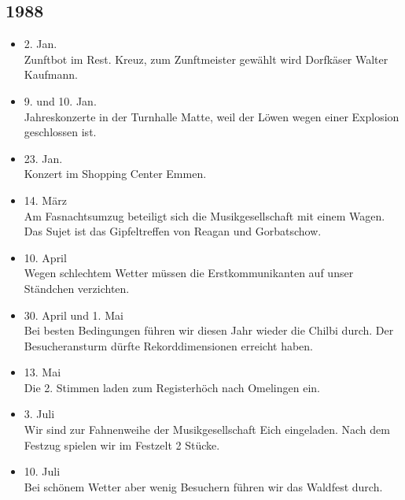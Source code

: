 \subsection{1988}

\begin{history}


    \begin{itemize}

        \item 2. Jan.\\
              Zunftbot im Rest. Kreuz, zum Zunftmeister gewählt wird Dorfkäser Walter
              Kaufmann.

        \item 9. und 10. Jan.\\
              Jahreskonzerte in der Turnhalle Matte, weil der Löwen wegen einer
              Explosion geschlossen ist.

        \item 23. Jan.\\
              Konzert im Shopping Center Emmen.

        \item 14. März\\
              Am Fasnachtsumzug beteiligt sich die Musikgesellschaft mit einem Wagen.
              Das Sujet ist das Gipfeltreffen von Reagan und Gorbatschow.

        \item 10. April\\
              Wegen schlechtem Wetter müssen die Erstkommunikanten auf unser Ständchen
              verzichten.

        \item 30. April und 1. Mai\\
              Bei besten Bedingungen führen wir diesen Jahr wieder die Chilbi durch.
              Der Besucheransturm dürfte Rekorddimensionen erreicht haben.

        \item 13. Mai\\
              Die 2. Stimmen laden zum Registerhöch nach Omelingen ein.

        \item 3. Juli\\
              Wir sind zur Fahnenweihe der Musikgesellschaft Eich eingeladen. Nach dem
              Festzug spielen wir im Festzelt 2 Stücke.

        \item 10. Juli\\
              Bei schönem Wetter aber wenig Besuchern führen wir das Waldfest durch.


\end{itemize}
\end{history}
